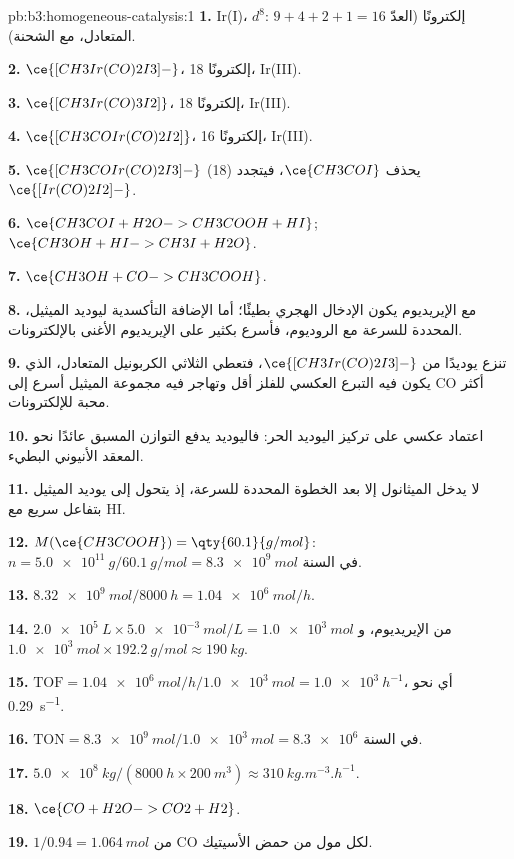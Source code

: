 \begin{solution}{pb:b3:homogeneous-catalysis:1}
\textbf{1.} Ir(I)، $d^8$: $9 + 4 + 2 + 1 = 16$ إلكترونًا (العدّ المتعادل، مع الشحنة).

\textbf{2.} $\ce{[CH3Ir(CO)2I3]-}$، 18 إلكترونًا، Ir(III).

\textbf{3.} $\ce{[CH3Ir(CO)3I2]}$، 18 إلكترونًا، Ir(III).

\textbf{4.} $\ce{[CH3COIr(CO)2I2]}$، 16 إلكترونًا، Ir(III).

\textbf{5.} $\ce{[CH3COIr(CO)2I3]-}$ (18) يحذف $\ce{CH3COI}$، فيتجدد $\ce{[Ir(CO)2I2]-}$.

\textbf{6.} $\ce{CH3COI + H2O -> CH3COOH + HI}$; $\ce{CH3OH + HI -> CH3I + H2O}$.

\textbf{7.} $\ce{CH3OH + CO -> CH3COOH}$.

\textbf{8.} مع الإيريديوم يكون الإدخال الهجري بطيئًا؛ أما الإضافة التأكسدية ليوديد
الميثيل، المحددة للسرعة مع الروديوم، فأسرع بكثير على الإيريديوم الأغنى
بالإلكترونات.

\textbf{9.} تنزع يوديدًا من $\ce{[CH3Ir(CO)2I3]-}$، فتعطي الثلاثي الكربونيل المتعادل، الذي
يكون فيه التبرع العكسي للفلز أقل وتهاجر فيه مجموعة الميثيل أسرع إلى CO أكثر
محبة للإلكترونات.

\textbf{10.} اعتماد عكسي على تركيز اليوديد الحر: فاليوديد يدفع
التوازن المسبق عائدًا نحو المعقد الأنيوني البطيء.

\textbf{11.} لا يدخل الميثانول إلا بعد الخطوة المحددة للسرعة، إذ يتحول إلى
يوديد الميثيل بتفاعل سريع مع HI.

\textbf{12.} $M(\ce{CH3COOH}) = \qty{60.1}{g/mol}$: $n = \qty{5.0e11}{g}/\qty{60.1}{g/mol} = \qty{8.3e9}{mol}$ في السنة.

\textbf{13.} $\qty{8.32e9}{mol}/\qty{8000}{h} = \qty{1.04e6}{mol/h}$.

\textbf{14.} $\qty{2.0e5}{L} \times \qty{5.0e-3}{mol/L} = \qty{1.0e3}{mol}$ من الإيريديوم، و$\qty{1.0e3}{mol} \times \qty{192.2}{g/mol} \approx \qty{190}{kg}$.

\textbf{15.} $\mathrm{TOF} = \qty{1.04e6}{mol/h}/\qty{1.0e3}{mol} = \qty{1.0e3}{h^{-1}}$، أي نحو \qty{0.29}{s^{-1}}.

\textbf{16.} $\mathrm{TON} = \qty{8.3e9}{mol}/\qty{1.0e3}{mol} = \num{8.3e6}$ في السنة.

\textbf{17.} $\qty{5.0e8}{kg}/(\qty{8000}{h} \times \qty{200}{m^3}) \approx \qty{310}{kg.m^{-3}.h^{-1}}$.

\textbf{18.} $\ce{CO + H2O -> CO2 + H2}$.

\textbf{19.} $1/0.94 = \qty{1.064}{mol}$ من CO لكل مول من حمض الأسيتيك.


\end{solution}
